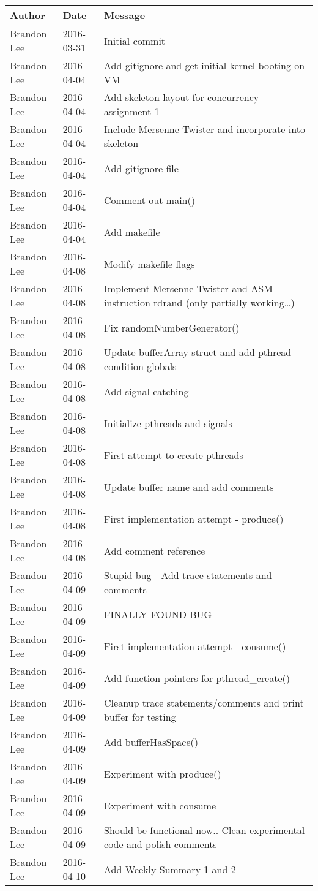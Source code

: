 \documentclass[letterpaper,10pt,titlepage]{article}
\begin{document}
\begin{tabular}{lll} \textbf{Author}
     & \textbf{Date}
     & \textbf{Message}

\\ \hline
Brandon Lee & 2016-03-31 & Initial commit \\ \hline
Brandon Lee & 2016-04-04 & Add gitignore and get initial kernel booting on VM \\ \hline
Brandon Lee & 2016-04-04 & Add skeleton layout for concurrency assignment 1 \\ \hline
Brandon Lee & 2016-04-04 & Include Mersenne Twister and incorporate into skeleton \\ \hline
Brandon Lee & 2016-04-04 & Add gitignore file \\ \hline
Brandon Lee & 2016-04-04 & Comment out main() \\ \hline
Brandon Lee & 2016-04-04 & Add makefile \\ \hline
Brandon Lee & 2016-04-08 & Modify makefile flags \\ \hline
Brandon Lee & 2016-04-08 & Implement Mersenne Twister and ASM instruction rdrand (only partially working\ldots{}) \\ \hline
Brandon Lee & 2016-04-08 & Fix randomNumberGenerator() \\ \hline
Brandon Lee & 2016-04-08 & Update bufferArray struct and add pthread condition globals \\ \hline
Brandon Lee & 2016-04-08 & Add signal catching \\ \hline
Brandon Lee & 2016-04-08 & Initialize pthreads and signals \\ \hline
Brandon Lee & 2016-04-08 & First attempt to create pthreads \\ \hline
Brandon Lee & 2016-04-08 & Update buffer name and add comments \\ \hline
Brandon Lee & 2016-04-08 & First implementation attempt - produce() \\ \hline
Brandon Lee & 2016-04-08 & Add comment reference \\ \hline
Brandon Lee & 2016-04-09 & Stupid bug - Add trace statements and comments \\ \hline
Brandon Lee & 2016-04-09 & FINALLY FOUND BUG \\ \hline
Brandon Lee & 2016-04-09 & First implementation attempt - consume() \\ \hline
Brandon Lee & 2016-04-09 & Add function pointers for pthread\_create() \\ \hline
Brandon Lee & 2016-04-09 & Cleanup trace statements/comments and print buffer for testing \\ \hline
Brandon Lee & 2016-04-09 & Add bufferHasSpace() \\ \hline
Brandon Lee & 2016-04-09 & Experiment with produce() \\ \hline
Brandon Lee & 2016-04-09 & Experiment with consume \\ \hline
Brandon Lee & 2016-04-09 & Should be functional now.. Clean experimental code and polish comments \\ \hline
Brandon Lee & 2016-04-10 & Add Weekly Summary 1 and 2 \\ \hline
\end{tabular}
\end{document}
